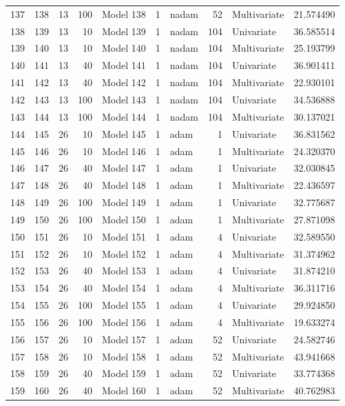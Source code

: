 \begin{tabular}{lrrrlrlrlr}
137 & 138 & 13 & 100 & Model 138 & 1 & nadam & 52 & Multivariate & 21.574490 \\
138 & 139 & 13 & 10 & Model 139 & 1 & nadam & 104 & Univariate & 36.585514 \\
139 & 140 & 13 & 10 & Model 140 & 1 & nadam & 104 & Multivariate & 25.193799 \\
140 & 141 & 13 & 40 & Model 141 & 1 & nadam & 104 & Univariate & 36.901411 \\
141 & 142 & 13 & 40 & Model 142 & 1 & nadam & 104 & Multivariate & 22.930101 \\
142 & 143 & 13 & 100 & Model 143 & 1 & nadam & 104 & Univariate & 34.536888 \\
143 & 144 & 13 & 100 & Model 144 & 1 & nadam & 104 & Multivariate & 30.137021 \\
144 & 145 & 26 & 10 & Model 145 & 1 & adam & 1 & Univariate & 36.831562 \\
145 & 146 & 26 & 10 & Model 146 & 1 & adam & 1 & Multivariate & 24.320370 \\
146 & 147 & 26 & 40 & Model 147 & 1 & adam & 1 & Univariate & 32.030845 \\
147 & 148 & 26 & 40 & Model 148 & 1 & adam & 1 & Multivariate & 22.436597 \\
148 & 149 & 26 & 100 & Model 149 & 1 & adam & 1 & Univariate & 32.775687 \\
149 & 150 & 26 & 100 & Model 150 & 1 & adam & 1 & Multivariate & 27.871098 \\
150 & 151 & 26 & 10 & Model 151 & 1 & adam & 4 & Univariate & 32.589550 \\
151 & 152 & 26 & 10 & Model 152 & 1 & adam & 4 & Multivariate & 31.374962 \\
152 & 153 & 26 & 40 & Model 153 & 1 & adam & 4 & Univariate & 31.874210 \\
153 & 154 & 26 & 40 & Model 154 & 1 & adam & 4 & Multivariate & 36.311716 \\
154 & 155 & 26 & 100 & Model 155 & 1 & adam & 4 & Univariate & 29.924850 \\
155 & 156 & 26 & 100 & Model 156 & 1 & adam & 4 & Multivariate & 19.633274 \\
156 & 157 & 26 & 10 & Model 157 & 1 & adam & 52 & Univariate & 24.582746 \\
157 & 158 & 26 & 10 & Model 158 & 1 & adam & 52 & Multivariate & 43.941668 \\
158 & 159 & 26 & 40 & Model 159 & 1 & adam & 52 & Univariate & 33.774368 \\
159 & 160 & 26 & 40 & Model 160 & 1 & adam & 52 & Multivariate & 40.762983 \\

\end{tabular}
